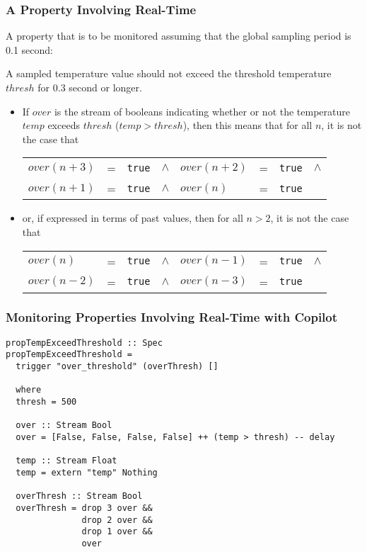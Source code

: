 \documentclass{beamer}
\begin{document}
\begin{frame}[fragile]
\frametitle{A Property Involving Real-Time}
A property that is to be monitored assuming that the global sampling
period is 0.1 second:

\begin{center}
A sampled temperature value should not exceed the threshold temperature $thresh$ for 0.3
second or longer.
\end{center}

\begin{itemize}
\item If $over$ is the stream of booleans indicating whether or not the temperature
$temp$ exceeds $thresh$ ($temp > thresh$), then this means that for all
$n$, it is not the case that \vspace{0.5em}

\begin{tabular}{lcl c lcl c}
$over (n + 3)$ & = & \verb,true, & $\wedge$ & $over(n + 2)$ & = & \verb,true, & $\wedge$\\
$over (n + 1)$ & = & \verb,true, & $\wedge$ & $over(n)$ & = & \verb,true,
\end{tabular}

\item or, if expressed in terms of past values, then for all $n > 2$,
it is not the case that \vspace{0.5em}

\begin{tabular}{lcl c lcl c}
$over (n)$ & = & \verb,true, & $\wedge$ & $over(n - 1)$ & = & \verb,true, & $\wedge$\\
$over (n - 2)$ & = & \verb,true, & $\wedge$ & $over(n - 3)$ & = & \verb,true,
\end{tabular}
\end{itemize}
\end{frame}

\begin{frame}[fragile]
\frametitle{Monitoring Properties Involving Real-Time with Copilot}
\begin{lstlisting}
propTempExceedThreshold :: Spec
propTempExceedThreshold =
  trigger "over_threshold" (overThresh) []

  where
  thresh = 500

  over :: Stream Bool
  over = [False, False, False, False] ++ (temp > thresh) -- delay

  temp :: Stream Float
  temp = extern "temp" Nothing

  overThresh :: Stream Bool
  overThresh = drop 3 over &&
               drop 2 over &&
               drop 1 over &&
               over

\end{lstlisting}
\end{frame}
\end{document}
